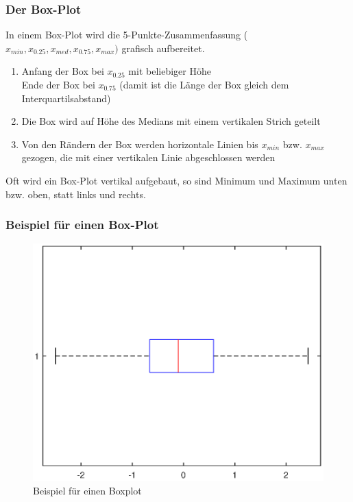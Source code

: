 \begin{frame}
\frametitle{Der Box-Plot}
In einem Box-Plot wird die 5-Punkte-Zusammenfassung ($x_{min},x_{0.25},x_{med},x_{0.75},x_{max})$ grafisch aufbereitet.
\begin{enumerate}
\item Anfang der Box bei $x_{0.25}$ mit beliebiger Höhe\\
Ende der Box bei $x_{0.75}$ (damit ist die Länge der Box gleich dem Interquartilsabstand)
\item Die Box wird auf Höhe des Medians mit einem vertikalen Strich geteilt
\item Von den Rändern der Box werden horizontale Linien bis $x_{min}$ bzw. $x_{max}$ gezogen, die mit einer vertikalen Linie abgeschlossen werden
\end{enumerate}
Oft wird ein Box-Plot vertikal aufgebaut, so sind Minimum und Maximum unten bzw. oben, statt links und rechts.
\end{frame}
\begin{frame}
\frametitle{Beispiel für einen Box-Plot}
\begin{figure}[hbtp]
\centering
\includegraphics[scale=0.55]{images/plot_boxplot.eps}
\caption{Beispiel für einen Boxplot}
\end{figure}
\end{frame}
